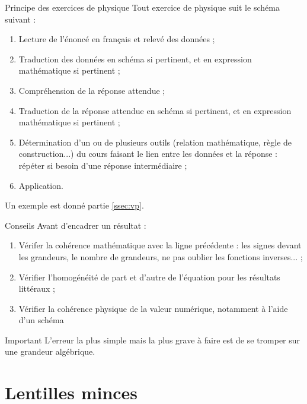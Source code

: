 \documentclass[10pt,a5paper,notitlepage]{book}
\begin{document}
\begin{NCprop}{Principe des exercices de physique}
    Tout exercice de physique suit le schéma suivant :
    \begin{enumerate}
        \item Lecture de l'énoncé en français et relevé des données ;
        \item Traduction des données en schéma si pertinent, et en expression
            mathématique si pertinent ;
        \item Compréhension de la réponse attendue ;
        \item Traduction de la réponse attendue en schéma si pertinent, et en
            expression mathématique si pertinent ;
        \item Détermination d'un ou de plusieurs outils (relation mathématique,
            règle de construction...) du cours faisant le lien entre les données
            et la réponse : répéter si besoin d'une réponse intermédiaire ;
        \item Application.
    \end{enumerate}
    Un exemple est donné partie \ref{ssec:vp}.
\end{NCprop}


\begin{NCcoro}{Conseils}
    Avant d'encadrer un résultat :
    \begin{enumerate}
        \item Vérifer la cohérence mathématique avec la ligne précédente : les
            signes devant les grandeurs, le nombre de grandeurs, ne pas oublier
            les fonctions inverses... ;
        \item Vérifier l'homogénéité de part et d'autre de l'équation pour les
            résultats littéraux ;
        \item Vérifier la cohérence physique de la valeur numérique, notamment à
            l'aide d'un schéma
    \end{enumerate}
\end{NCcoro}

\begin{NCimpo}{Important}
    L'erreur la plus simple mais la plus grave à faire est de se tromper sur une
    grandeur algébrique.
    \begin{center}
    \end{center}
\end{NCimpo}

\chapter{Lentilles minces}\label{ch:O1}
\vspace*{-24pt}
\end{document}
